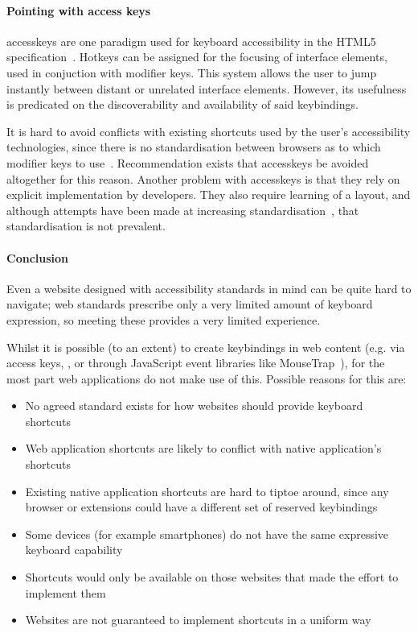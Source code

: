 \documentclass[11pt,openright,a4paper]{report}
\begin{document}
\paragraph{Pointing with access keys}
\label{accesskeysection}
  \Gls{accesskeys} are one paradigm used for keyboard accessibility in the HTML5 specification~\cite{html5specaccesskeys}. Hotkeys can be assigned for the focusing of interface elements, used in conjuction with modifier keys. This system allows the user to jump instantly between distant or unrelated interface elements. However, its usefulness is predicated on the discoverability and availability of said \glspl{keybinding}.

  It is hard to avoid conflicts with existing shortcuts used by the user's accessibility technologies, since there is no standardisation between browsers as to which modifier keys to use~\cite{webaimaccesskeys}. Recommendation exists that \gls{accesskeys} be avoided altogether for this reason. Another problem with \gls{accesskeys} is that they rely on explicit implementation by developers. They also require learning of a layout, and although attempts have been made at increasing standardisation~\cite{AccesskeyStandardisation}, that standardisation is not prevalent.
\paragraph{Conclusion}
  Even a website designed with accessibility standards in mind can be quite hard to navigate; web standards prescribe only a very limited amount of keyboard expression, so meeting these provides a very limited experience.

  Whilst it is possible (to an extent) to create \glspl{keybinding} in web content (e.g. via access keys, , or through JavaScript event libraries like MouseTrap~\cite{Mousetrap}), for the most part web applications do not make use of this. Possible reasons for this are:

\begin{itemize}
 \item No agreed standard exists for how websites should provide keyboard shortcuts
 \item Web application shortcuts are likely to conflict with native application's shortcuts
 \item Existing native application shortcuts are hard to tiptoe around, since any browser or extensions could have a different set of reserved keybindings
 \item Some devices (for example smartphones) do not have the same expressive keyboard capability
 \item Shortcuts would only be available on those websites that made the effort to implement them
 \item Websites are not guaranteed to implement shortcuts in a uniform way
\end{itemize}
\end{document}
